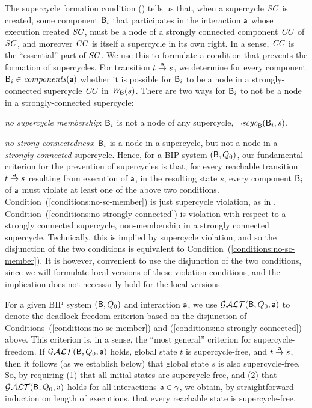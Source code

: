 The supercycle formation condition () tells us that, when a supercycle $\SC$ is created, some component
$\B_i$ that participates in the interaction $\act$ whose execution created $\SC$, must be a node of a strongly connected component $\CC$ of $\SC$, and
moreover $\CC$ is itself a supercycle in its own right. In a sense, $\CC$ is the ``essential'' part of $\SC$.  We use this to formulate a condition
that prevents the formation of supercycles. For transition $t \goesto[\act] s$, we determine for every component $\B_i \in \cmps{\act}$ whether it is
possible for $\B_i$ to be a node in a strongly-connected supercycle $\CC$ in $\wfg{\B}{s}$.  There are two ways for $\B_i$ to not be a node in a
strongly-connected supercycle: 
%
\bn
\item \label{conditions:no-sc-member}   \textit{no supercycle membership}: $\B_i$ is not a node of any supercycle, \ie $\neg \scyc{\B}{s}{\B_i}$.
\item  \label{conditions:no-strongly-connected} \textit{no strong-connectedness}: $\B_i$ is a node in a supercycle, but not a node in a \emph{strongly-connected} supercycle. 
\en
%
Hence, for a BIP system $(\B, Q_0)$, our fundamental criterion for the prevention of supercycles is that, for every reachable transition
$t \goesto[\act] s$ resulting from execution of $\act$, in the resulting state $s$, every component $\B_i$ of $\act$ must violate at least one of the
above two conditions.  Condition~(\ref{conditions:no-sc-member}) is just supercycle violation, as in .
Condition~(\ref{conditions:no-strongly-connected}) is violation with respect to a strongly connected supercycle, \ie non-membership in a strongly
connected supercycle. Technically, this is implied by supercycle violation, and so the disjunction of the two conditions is equivalent to 
Condition~(\ref{conditions:no-sc-member}). It is however, convenient to use the disjunction of the two conditions, since
we will formulate local versions of these violation conditions, and the implication does not necessarily hold for the local versions.

For a given BIP system $(\B, Q_0)$ and interaction $\act$, we use $\GAO(\B, Q_0, \act)$ to denote the deadlock-freedom criterion based on the
disjunction of Conditions~(\ref{conditions:no-sc-member}) and (\ref{conditions:no-strongly-connected}) above. 
This criterion is, in a sense, the ``most general'' criterion for supercycle-freedom.
%
If $\GAO(\B, Q_0, \act)$ holds, global state $t$ is supercycle-free, and $t \goesto[\act] s$, then it follows (as we establish below) that global
state $s$ is also supercycle-free.  So, by requiring (1) that all initial states are supercycle-free, and (2) that $\GAO(\B, Q_0, \act)$ holds for all
interactions $\act \in \gamma$, we obtain, by straightforward induction on length of executions, that every reachable state is supercycle-free.

